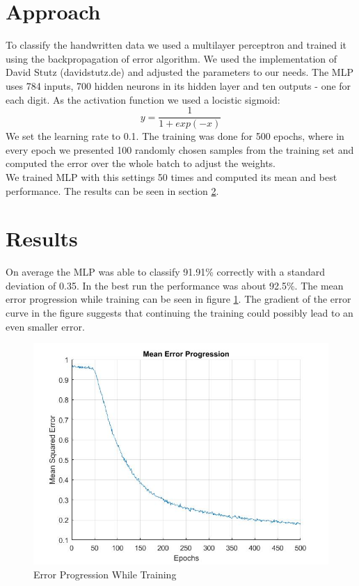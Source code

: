 \documentclass[paper=a4, fontsize=11pt]{scrartcl} %
\numberwithin{equation}{section} %
\numberwithin{figure}{section} %
\numberwithin{table}{section} %
\begin{document}
\section{Approach}
To classify the handwritten data we used a multilayer perceptron and trained it using the backpropagation of error algorithm. We used the implementation of David Stutz (davidstutz.de) and adjusted the parameters to our needs.
The MLP uses 784 inputs, 700 hidden neurons in its hidden layer and ten outputs - one for each digit.
As the activation function we used a locistic sigmoid:
\[ y = \frac{1}{1+exp(-x)}\]
We set the learning rate to 0.1. The training was done for 500 epochs, where in every epoch we presented 100 randomly chosen samples from the training set and computed the error over the whole batch to adjust the weights.\\
We trained MLP with this settings 50 times and computed its mean and best performance. The results can be seen in section \ref{sec:results}.

\section{Results}
\label{sec:results}

On average the MLP was able to classify 91.91\% correctly with a standard deviation of 0.35. In the best run the performance was about 92.5\%. The mean error progression while training can be seen in figure \ref{fig:error}. The gradient of the error curve in the figure suggests that continuing the training could possibly lead to an even smaller error. 





\begin{figure}[H]
	\centering
	\includegraphics[width = 0.6\linewidth]{./errorProgression.jpg}
	\caption{Error Progression While Training}
	\label{fig:error}
\end{figure}
\end{document}
